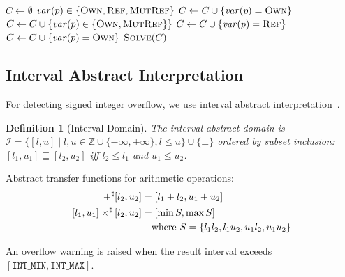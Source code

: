 \documentclass[11pt,a4paper]{article}
\newtheorem{definition}[theorem]{Definition}
\begin{document}
\begin{appendices}
\begin{algorithm}[h]
\caption{Ownership Inference via Constraint Solving}\label{alg:ownership}
\begin{algorithmic}[1]
  \State $C \gets \emptyset$
    \State $\mathit{var}(p) \in \{\textsc{Own}, \textsc{Ref}, \textsc{MutRef}\}$
      \State $C \gets C \cup \{\mathit{var}(p) = \textsc{Own}\}$
      \State $C \gets C \cup \{\mathit{var}(p) \in \{\textsc{Own}, \textsc{MutRef}\}\}$
    \Else
      \State $C \gets C \cup \{\mathit{var}(p) = \textsc{Ref}\}$
    \EndIf
      \State $C \gets C \cup \{\mathit{var}(p) = \textsc{Own}\}$
    \EndIf
  \EndFor
  \State \Return $\Call{Solve}{C}$
\EndProcedure
\end{algorithmic}
\end{algorithm}

\subsection{Interval Abstract Interpretation}\label{app:abstract}

For detecting signed integer overflow, we use interval abstract
interpretation~\cite{cousot1977abstract}.

\begin{definition}[Interval Domain]
The interval abstract domain is $\mathcal{I} = \{[l, u] \mid l, u \in
\mathbb{Z} \cup \{-\infty, +\infty\}, l \leq u\} \cup \{\bot\}$
ordered by subset inclusion: $[l_1, u_1] \sqsubseteq [l_2, u_2]$ iff
$l_2 \leq l_1$ and $u_1 \leq u_2$.
\end{definition}

Abstract transfer functions for arithmetic operations:
\begin{align}
  [l_1, u_1] +^{\sharp} [l_2, u_2] &= [l_1 + l_2, u_1 + u_2] \\
  [l_1, u_1] \times^{\sharp} [l_2, u_2] &= [\min S, \max S] \notag\\
  &\quad \text{where } S = \{l_1 l_2, l_1 u_2, u_1 l_2, u_1 u_2\}
\end{align}

An overflow warning is raised when the result interval exceeds
$[\texttt{INT\_MIN}, \texttt{INT\_MAX}]$.


\end{appendices}
\end{document}
